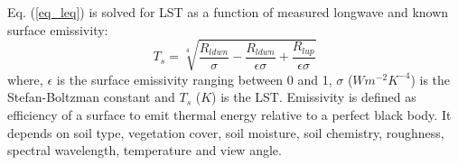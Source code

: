\documentclass[fleqn,10pt]{wlscirep}
\begin{document}
Eq. (\ref{eq_leq}) is solved for LST as a function of measured longwave and known surface emissivity:
\begin{equation}\label{eq_Tleq}
T_{s} = \sqrt[4]{\frac{R_{ldwn}}{\sigma} - \frac{R_{ldwn}}{\epsilon \sigma} + \frac{R_{lup}}{\epsilon \sigma}}
\end{equation}
where, $\epsilon$ is the surface emissivity ranging between 0 and 1, $\sigma$ ($Wm^{-2}K^{-4}$) is the Stefan-Boltzman constant and $T_{s}$ ($K$) is the LST. %
Emissivity is defined as efficiency of a surface to emit thermal energy relative to a perfect black body. It  depends on soil type, vegetation cover, soil moisture, soil chemistry, roughness, spectral wavelength, temperature and view angle\cite{norman1995terminology}. %
\end{document}
